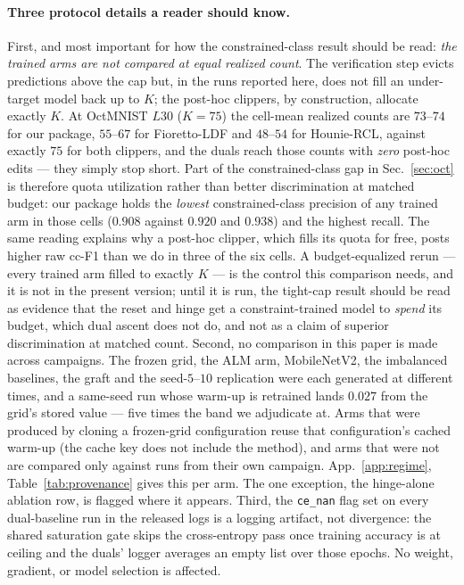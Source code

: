 \documentclass[10pt]{article}
\begin{document}
{
\paragraph{Three protocol details a reader should know.}
First, and most important for how the constrained-class result should be read:
\emph{the trained arms are not compared at equal realized count}. The verification
step evicts predictions above the cap but, in the runs reported here, does not fill
an under-target model back up to $K$; the post-hoc clippers, by construction,
allocate exactly $K$. At OctMNIST $L30$ ($K{=}75$) the cell-mean realized counts are
$73$--$74$ for our package, $55$--$67$ for Fioretto-LDF and $48$--$54$ for
Hounie-RCL, against exactly $75$ for both clippers, and the duals reach those counts
with \emph{zero} post-hoc edits --- they simply stop short. Part of the
constrained-class gap in Sec.~\ref{sec:oct} is therefore quota utilization rather
than better discrimination at matched budget: our package holds the \emph{lowest}
constrained-class precision of any trained arm in those cells ($0.908$ against
$0.920$ and $0.938$) and the highest recall. The same reading explains why a
post-hoc clipper, which fills its quota for free, posts higher raw cc-F1 than we do
in three of the six cells. A budget-equalized rerun --- every trained arm filled to
exactly $K$ --- is the control this comparison needs, and it is not in the present
version; until it is run, the tight-cap result should be read as evidence that the
reset and hinge get a constraint-trained model to \emph{spend} its budget, which
dual ascent does not do, and not as a claim of superior discrimination at matched
count.
Second, no comparison in this paper is made across campaigns. The frozen grid,
the ALM arm, MobileNetV2, the imbalanced baselines, the graft and the
seed-$5$--$10$ replication were each generated at different times, and a
same-seed run whose warm-up is retrained lands $0.027$ from the grid's stored
value --- five times the band we adjudicate at. Arms that were produced by
cloning a frozen-grid configuration reuse that configuration's cached warm-up
(the cache key does not include the method), and arms that were not are compared
only against runs from their own campaign. App.~\ref{app:regime},
Table~\ref{tab:provenance} gives this per arm. The one exception, the
hinge-alone ablation row, is flagged where it appears.
Third, the \texttt{ce\_nan} flag set on every dual-baseline run in the released
logs is a logging artifact, not divergence: the shared saturation gate skips the
cross-entropy pass once training accuracy is at ceiling and the duals' logger
averages an empty list over those epochs. No weight, gradient, or model selection
is affected.
}
\end{document}
